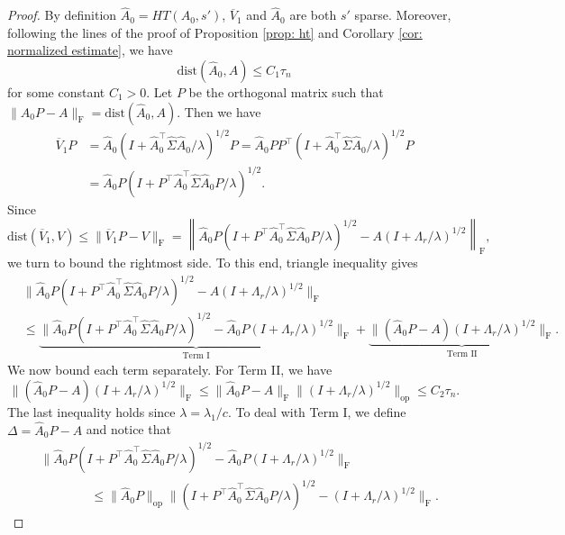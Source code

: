 \documentclass[11pt]{article}
\newcommand{\init}{\widehat{A}_0}
\newcommand{\hs}{s'}
\newcommand{\scale}{V}
\newcommand{\gd}{\overline{V}}
\newcommand{\0}{{\mathbf{0}}}
\newcommand{\op}{{\mathrm{op}}}
\newcommand{\ssecond}{{\widehat{\Sigma}}}
\begin{document}
\begin{proof}
By definition $\widehat{A}_0 =HT(A_0,\hs)$, $\gd_1$ and $\init $ are both $s'$ sparse. 
Moreover, following the lines of the proof of Proposition \ref{prop: ht} and Corollary \ref{cor: normalized estimate}, we have 
\begin{equation*}
\mathrm{dist}(\init ,A)\leq C_1\tau_n
\end{equation*}
for some constant $C_1 > 0$. 
Let $P$ be the orthogonal matrix such that 
$\|\init P-A\|_\mathrm{F} = \mathrm{dist}(\init , A)$.
Then we have
\begin{align*}
\gd_1P
&=\init (I+{\init ^\top  \ssecond\init }/{\lambda})^{1/2}P
=\init  P P^\top (I+{\init ^\top  \ssecond\init }/{\lambda})^{1/2}P\\
& =\init P(I+ {P^\top  \init ^\top \ssecond\init P}/{\lambda})^{1/2}.
\end{align*}
Since \begin{equation*}
\mathrm{dist}(\gd_1,\scale)\leq \|\gd_1P-\scale\|_\mathrm{F}=
\left\|\init P(I+{P^\top  \init ^\top\ssecond\init P}/{\lambda})^{1/2}-A(I+{\Lambda_r}/{\lambda})^{1/2}
\right\|_\mathrm{F},
\end{equation*}
we turn to bound the rightmost side. 
To this end, triangle inequality gives
\begin{align*}
& \|\init P(I+{P^\top  \init^\top \ssecond\init P}/{\lambda})^{1/2}-A(I+{\Lambda_r}/{\lambda})^{1/2}\|_\mathrm{F}\\
& \leq \underbrace{\|\init P(I+{P^\top  \init^\top \ssecond\init P}/{\lambda})^{1/2}-\init P(I+{\Lambda_r}/{\lambda})^{1/2}\|_\mathrm{F}}_{\text{Term I}}
+\underbrace{\|(\init P-A)(I+{\Lambda_r}/{\lambda})^{1/2}\|_\mathrm{F}}_{\text{Term II}}.
\end{align*}
We now bound each term separately. 
For Term II, we have
\begin{equation*}
\|(\init P-A)(I+{\Lambda_r}/{\lambda})^{1/2}\|_\mathrm{F}\leq\|\init P-A\|_\mathrm{F}\|(I+{\Lambda_r}/{\lambda})^{1/2}\|_\op\leq C_2\tau_n.
\end{equation*}
The last inequality holds since $\lambda = \lambda_1/c$.
To deal with Term I, we define $\Delta=\init P-A$ and notice that 
\begin{align*}
& \|\init P(I+{P^\top  \init ^\top\ssecond\init P}/{\lambda})^{1/2}
-\init P(I+{\Lambda_r}/{\lambda})^{1/2}\|_\mathrm{F}\\
& \qquad \qquad
\leq \|\init P\|_\op\|(I+{P^\top  \init ^\top\ssecond\init P}/{\lambda})^{1/2}-(I+{\Lambda_r}/{\lambda})^{1/2}\|_\mathrm{F}.

\end{align*}
\end{proof}
\end{document}
